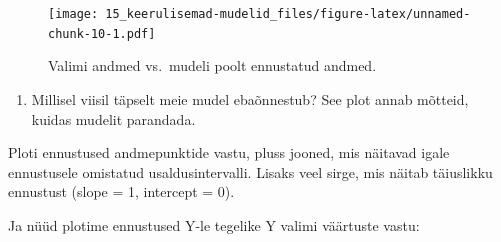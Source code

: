 \documentclass[]{book}
\providecommand{\tightlist}{%
  \setlength{\itemsep}{0pt}\setlength{\parskip}{0pt}}
\begin{document}
\begin{figure}
\centering
\texttt{[image: 15\_keerulisemad-mudelid\_files/figure-latex/unnamed-chunk-10-1.pdf]}
\caption{\label{fig:unnamed-chunk-10}Valimi andmed vs.~mudeli poolt
ennustatud andmed.}
\end{figure}

\begin{enumerate}
\def\labelenumi{\arabic{enumi})}
\setcounter{enumi}{1}
\tightlist
\item
  Millisel viisil täpselt meie mudel ebaõnnestub? See plot annab
  mõtteid, kuidas mudelit parandada.
\end{enumerate}

Ploti ennustused andmepunktide vastu, pluss jooned, mis näitavad igale
ennustusele omistatud usaldusintervalli. Lisaks veel sirge, mis näitab
täiuslikku ennustust (slope = 1, intercept = 0).

Ja nüüd plotime ennustused Y-le tegelike Y valimi väärtuste vastu:
\end{document}
